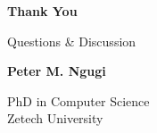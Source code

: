 \documentclass[aspectratio=169,11pt]{beamer}
\begin{document}
	
	\begin{frame}[plain]
		
		\begin{center}
			
			\vspace{1.5cm}
			
			{\fontsize{34}{40}\selectfont
				\bfseries
				\color{CyberBlue}
				Thank You
			}
			
			\vspace{0.5cm}
			
			{\Large
				Questions \& Discussion
			}
			
			\vspace{1cm}
			
			{\large
				\textbf{Peter M. Ngugi}
			}
			
			\vspace{0.15cm}
			
			{\small
				PhD in Computer Science\\
				Zetech University
			}
			
		\end{center}
		
	\end{frame}
	
	
\end{document}
